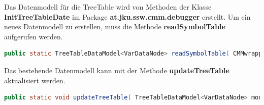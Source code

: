 Das Datenmodell für die TreeTable wird von Methoden der Klasse \textbf{InitTreeTableDate} im Package \textbf{at.jku.ssw.cmm.debugger} erstellt. Um ein neues Datenmodell zu erstellen, muss die Methode \textbf{readSymbolTable} aufgerufen werden.
\begin{lstlisting}[language=JAVA]
public static TreeTableDataModel<VarDataNode> readSymbolTable( CMMwrapper compiler, GUImain main, String fileName, String[] columnNames, Class<?>[] columnTypes );
\end{lstlisting}

Das bestehende Datenmodell kann mit der Methode \textbf{updateTreeTable} aktualisiert werden.
\begin{lstlisting}[language=JAVA]
public static void updateTreeTable( TreeTableDataModel<VarDataNode> model, VarDataNode node, CMMwrapper compiler, GUImain main, String fileName );
\end{lstlisting}

